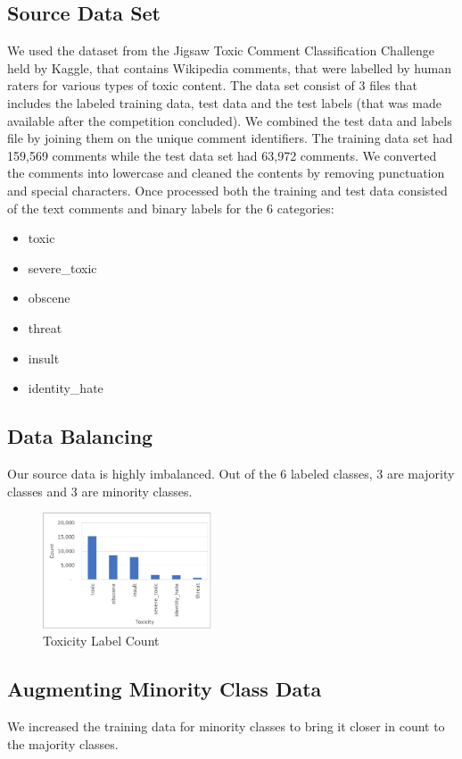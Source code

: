 \documentclass[11pt,a4paper]{article}
\begin{document}
\subsection{Source Data Set}
We used the dataset from the Jigsaw Toxic Comment Classification Challenge \cite{jigsaw-toxic-comment-classification-challenge} held by Kaggle, that contains Wikipedia comments, that were labelled by human raters for various types of toxic content.  The data set consist of 3 files that includes the labeled training data, test data and the test labels (that was made available after the competition concluded).  We combined the test data and labels file by joining them on the unique comment identifiers. The training data set had 159,569 comments while the test data set had 63,972 comments. We converted the comments into lowercase and cleaned the contents by removing punctuation and special characters. Once processed both the training and test data  consisted of the text comments and binary labels for the 6 categories:

\begin{itemize}
\item toxic
\item severe\_toxic
\item obscene
\item threat
\item insult
\item identity\_hate
\end{itemize}



\subsection{Data Balancing}
Our source data is highly imbalanced. Out of the 6 labeled classes, 3 are majority classes and 3 are minority classes.


\begin{figure}[h!]
\centering
\includegraphics[width=50mm,scale=0.5]{label_counts.png}
\caption{Toxicity Label Count}
\label{Fig1. label count vs toxicity}
\end{figure}


\subsection{Augmenting Minority Class Data}
We increased the training data for minority classes to bring it closer in count to the majority classes.
\end{document}
